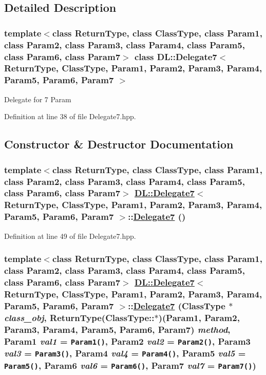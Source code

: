 \subsection{Detailed Description}
\subsubsection*{template$<$class Return\-Type, class Class\-Type, class Param1, class Param2, class Param3, class Param4, class Param5, class Param6, class Param7$>$ class DL::Delegate7$<$ Return\-Type, Class\-Type, Param1, Param2, Param3, Param4, Param5, Param6, Param7 $>$}

Delegate for 7 Param



Definition at line 38 of file Delegate7.hpp.

\subsection{Constructor \& Destructor Documentation}
\hypertarget{classDL_1_1Delegate7_d0}{
\subsubsection[Delegate7]{\setlength{\rightskip}{0pt plus 5cm}template$<$class Return\-Type, class Class\-Type, class Param1, class Param2, class Param3, class Param4, class Param5, class Param6, class Param7$>$ \hyperlink{classDL_1_1Delegate7}{DL::Delegate7}$<$ Return\-Type, Class\-Type, Param1, Param2, Param3, Param4, Param5, Param6, Param7 $>$::\hyperlink{classDL_1_1Delegate7}{Delegate7} ()}}
\label{classDL_1_1Delegate7_d0}




Definition at line 49 of file Delegate7.hpp.\hypertarget{classDL_1_1Delegate7_a0}{
\subsubsection[Delegate7]{\setlength{\rightskip}{0pt plus 5cm}template$<$class Return\-Type, class Class\-Type, class Param1, class Param2, class Param3, class Param4, class Param5, class Param6, class Param7$>$ \hyperlink{classDL_1_1Delegate7}{DL::Delegate7}$<$ Return\-Type, Class\-Type, Param1, Param2, Param3, Param4, Param5, Param6, Param7 $>$::\hyperlink{classDL_1_1Delegate7}{Delegate7} (Class\-Type $\ast$ {\em class\_\-obj}, Return\-Type(Class\-Type::$\ast$)(Param1, Param2, Param3, Param4, Param5, Param6, Param7) {\em method}, Param1 {\em val1} = {\tt Param1()}, Param2 {\em val2} = {\tt Param2()}, Param3 {\em val3} = {\tt Param3()}, Param4 {\em val4} = {\tt Param4()}, Param5 {\em val5} = {\tt Param5()}, Param6 {\em val6} = {\tt Param6()}, Param7 {\em val7} = {\tt Param7()})}}
\label{classDL_1_1Delegate7_a0}




